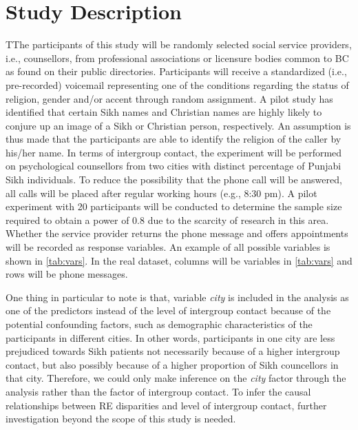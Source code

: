 \documentclass[11pt]{article}
\begin{document}
\section{Study Description}
TThe participants of  this study will be randomly selected social service providers, i.e.,  counsellors,  from professional associations or licensure bodies common to BC as found on their public directories.  Participants will receive a standardized (i.e., pre-recorded) voicemail representing one of the conditions regarding the status of religion, gender and/or accent through random assignment. A pilot study has identified that certain Sikh names and Christian names are highly likely to conjure up an image of a Sikh or Christian person, respectively. An assumption is thus made that the participants are able to identify  the religion of the caller by his/her name. In terms of intergroup contact, the experiment will be performed on psychological counsellors from two cities with distinct percentage of Punjabi Sikh individuals. To reduce the possibility that the phone call will be answered, all calls will be placed after regular working hours (e.g., 8:30 pm). A pilot experiment with 20 participants will be conducted to determine the sample size required to obtain a power of 0.8 due to the scarcity of research in this area. Whether the service provider returns the phone message and offers appointments will be recorded as response variables. An example of all possible variables is shown in \autoref{tab:vars}. In the real dataset, columns will be variables in \autoref{tab:vars} and rows will be phone messages. 

One thing in particular to note is that, variable \textit{city} is included in the analysis as one of the predictors instead of the level of intergroup contact because of the potential confounding factors, such as demographic characteristics of the participants in different cities. In other words, participants in one city are less prejudiced towards Sikh patients not necessarily because of a higher intergroup contact, but also possibly because of a higher proportion of Sikh councellors in that city. Therefore, we could only make inference on the \textit{city} factor through the analysis rather than the factor of intergroup contact. To infer the causal relationships between RE disparities and level of intergroup contact, further investigation beyond the scope of this study is needed.
\end{document}
